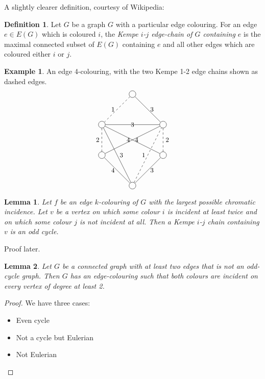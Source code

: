\documentclass{article}
\newtheorem*{lem}{Lemma}
\theoremstyle{definition}
\newtheorem*{defn}{Definition}
\newtheorem*{ex}{Example}
\begin{document}
A slightly clearer definition, courtesy of Wikipedia:
\begin{defn}
Let $G$ be a graph $G$ with a particular edge colouring.
For an edge $e \in E(G)$ which is coloured $i$, the \emph{Kempe $i$-$j$ edge-chain of $G$ containing $e$} is the maximal connected subset of $E(G)$ containing $e$ and all other edges which are coloured either $i$ or $j$.
\end{defn}
\begin{ex}
An edge 4-colouring, with the two Kempe 1-2 edge chains shown as dashed edges.
$$
\begin{tikzpicture}[baseline=5.5ex]
  \tikzstyle{every node}=[font=\small]
  \node[draw,circle] (1) at (1.5,4.5) {};
  \node[draw,circle] (2) at (0,3) {};
  \node[draw,circle] (3) at (3,3) {};
  \node[draw,circle] (4) at (0,1.5) {};
  \node[draw,circle] (5) at (3,1.5) {};
  \node[draw,circle] (6) at (1.5,0) {};
  \path[]
  (1) edge node [right]{3} (3)
    (2) edge node {3} (3)
    (3) edge node [left]{4} (4)
    (4) edge node [left]{4} (6)
    (5) edge node [right]{4} (2)
    (6) edge node [right]{3} (5)
    (2) edge node [right]{3} (6);
  \draw[dashed]
  (1) edge node [left]{1} (2)
  (2) edge node [left]{2} (4)
  (6) edge node [left]{1} (3)
    (3) edge node [right]{2} (5);
\end{tikzpicture}
$$
\end{ex}

\begin{lem}
Let $f$ be an edge $k$-colouring of $G$ with the largest possible chromatic incidence.
Let $v$ be a vertex on which some colour $i$ is incident at least twice and on which some colour $j$ is not incident at all.
Then a Kempe $i$-$j$ chain containing $v$ is an odd cycle.
\end{lem}

Proof later.

\begin{lem}
Let $G$ be a connected graph with at least two edges that is not an odd-cycle graph.
Then $G$ has an edge-colouring such that both colours are incident on every vertex of degree at least 2.
\end{lem}

\begin{proof}
We have three cases:
\begin{itemize}
\item Even cycle
\item Not a cycle but Eulerian
\item Not Eulerian
\end{itemize}
\end{proof}
\end{document}
